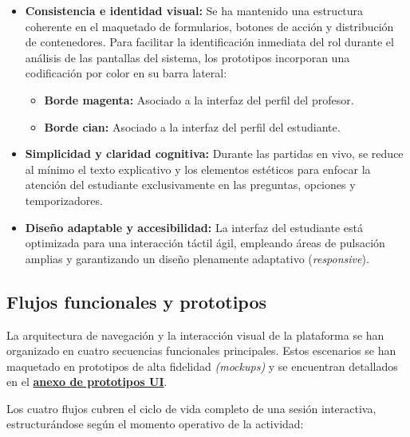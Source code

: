 \begin{itemize}
    \item \textbf{Consistencia e identidad visual:} Se ha mantenido una estructura coherente en el maquetado de formularios, botones de acción y distribución de contenedores. Para facilitar la identificación inmediata del rol durante el análisis de las pantallas del sistema, los prototipos incorporan una codificación por color en su barra lateral:
    \begin{itemize}
        \item \textbf{Borde magenta:} Asociado a la interfaz del perfil del profesor.
        \item \textbf{Borde cian:} Asociado a la interfaz del perfil del estudiante.
    \end{itemize}
    \item \textbf{Simplicidad y claridad cognitiva:} Durante las partidas en vivo, se reduce al mínimo el texto explicativo y los elementos estéticos para enfocar la atención del estudiante exclusivamente en las preguntas, opciones y temporizadores.
    \item \textbf{Diseño adaptable y accesibilidad:} La interfaz del estudiante está optimizada para una interacción táctil ágil, empleando áreas de pulsación amplias y garantizando un diseño plenamente adaptativo (\textit{responsive}).
\end{itemize}

\subsection{Flujos funcionales y prototipos}

La arquitectura de navegación y la interacción visual de la plataforma se han organizado en cuatro secuencias funcionales principales. Estos escenarios se han maquetado en prototipos de alta fidelidad \textit{(mockups)} y se encuentran detallados en el \hyperref[anexo:prototipos_interfaz_usuario]{\textbf{anexo de prototipos UI}}. 

Los cuatro flujos cubren el ciclo de vida completo de una sesión interactiva, estructurándose según el momento operativo de la actividad:


